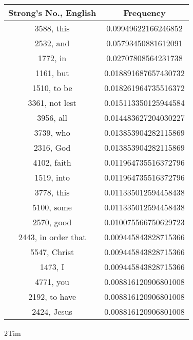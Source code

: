 \documentclass[12pt,letterpaper]{article}
\begin{document}
 \begin{longtable}{|c|c|}
\hline
 Strong's No., English & Frequency \\ \hline  
3588, this & 0.09949622166246852\\ \hline 
 2532, and & 0.05793450881612091\\ \hline 
 1772, in & 0.02707808564231738\\ \hline 
 1161, but & 0.018891687657430732\\ \hline 
 1510, to be & 0.018261964735516372\\ \hline 
 3361, not lest & 0.015113350125944584\\ \hline 
 3956, all & 0.014483627204030227\\ \hline 
 3739, who & 0.013853904282115869\\ \hline 
 2316, God & 0.013853904282115869\\ \hline 
 4102, faith & 0.011964735516372796\\ \hline 
 1519, into & 0.011964735516372796\\ \hline 
 3778, this & 0.011335012594458438\\ \hline 
 5100, some & 0.011335012594458438\\ \hline 
 2570, good & 0.010075566750629723\\ \hline 
 2443, in order that & 0.009445843828715366\\ \hline 
 5547, Christ & 0.009445843828715366\\ \hline 
 1473, I & 0.009445843828715366\\ \hline 
 4771, you & 0.008816120906801008\\ \hline 
 2192, to have & 0.008816120906801008\\ \hline 
 2424, Jesus & 0.008816120906801008\\ \hline 
\end{longtable} 
 

2Tim
\end{document}
